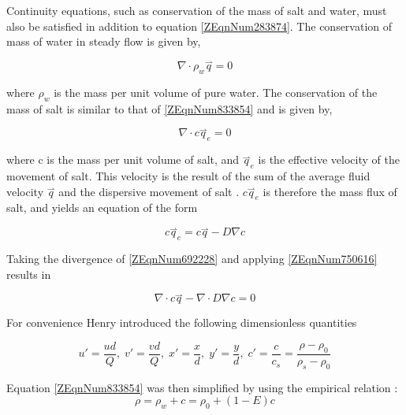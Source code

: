 \documentclass{article}
\newcommand{\csp}{, \;} %
\begin{document}
Continuity equations, such as conservation of the mass of salt and water, must
also be satisfied in addition to equation \eqref{ZEqnNum283874}. The
conservation of mass of water in steady flow is given by,

\begin{equation} \label{ZEqnNum833854} 
    \nabla \cdot \rho _{w}
    \stackrel{\rightharpoonup}{q}=0 
\end{equation} 

where $\rho _{w} $ is the mass per unit volume of pure water. The conservation
of the mass of salt is similar to that of \eqref{ZEqnNum833854} and is given
by,

\begin{equation} \label{ZEqnNum750616} 
    \nabla \cdot
    c\stackrel{\rightharpoonup}{q}_{e} =0 
\end{equation} 

where c is the mass per unit volume of salt, and
$\stackrel{\rightharpoonup}{q}_{e} $ is the effective velocity of the movement
of salt. This velocity is the result of the sum of the average fluid velocity
$\stackrel{\rightharpoonup}{q}$ and the dispersive movement of salt
\cite{Henry60}. $c\stackrel{\rightharpoonup}{q}_{e} $ is therefore the mass flux
of salt, and yields an equation of the form

\begin{equation} \label{ZEqnNum692228} 
    c\stackrel{\rightharpoonup}{q}_{e} = c\stackrel{\rightharpoonup}{q}-D\nabla c 
\end{equation} 

Taking the divergence of \eqref{ZEqnNum692228} and applying
\eqref{ZEqnNum750616} results in

\begin{equation} 
    \label{ZEqnNum193707} \nabla \cdot
    c\stackrel{\rightharpoonup}{q}-\nabla \cdot D\nabla c=0 
\end{equation} 

For convenience Henry introduced the following dimensionless quantities

\begin{equation} \label{ZEqnNum621601} 
    u'=\frac{ud}{Q} \csp v'=\frac{vd}{Q}
     \csp x'=\frac{x}{d} \csp y'=\frac{y}{d} \csp c'=\frac{c}{c_{s} }
    =\frac{\rho -\rho _{0} }{\rho _{s} -\rho _{0} } 
\end{equation}

Equation \eqref{ZEqnNum833854} was then simplified by using the empirical
relation \cite{Baxter} \cite{Henry60}:
\begin{equation} \label{ZEqnNum679206} 
    \rho =\rho _{w} +c=\rho _{0} + \left(1-E\right)c 
\end{equation} 
\end{document}
